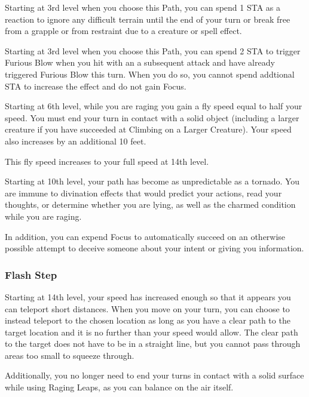 Starting at 3rd level when you choose this Path, you can spend 1 STA as a reaction to ignore any difficult terrain until the end of your turn or break free from a grapple or from restraint due to a creature or spell effect.

Starting at 3rd level when you choose this Path, you can spend 2 STA to trigger Furious Blow when you hit with an a subsequent attack and have already triggered Furious Blow this turn. When you do so, you cannot spend addtional STA to increase the effect and do not gain Focus.

Starting at 6th level, while you are raging you gain a fly speed equal to half your speed. You must end your turn in contact with a solid object (including a larger creature if you have succeeded at Climbing on a Larger Creature). Your speed also increases by an additional 10 feet.

This fly speed increases to your full speed at 14th level.

Starting at 10th level, your path has become as unpredictable as a tornado. You are immune to divination effects that would predict your actions, read your thoughts, or determine whether you are lying, as well as the charmed condition while you are raging.

In addition, you can expend Focus to automatically succeed on an otherwise possible attempt to deceive someone about your intent or giving you information.

\subsubsection{Flash Step}
Starting at 14th level, your speed has increased enough so that it appears you can teleport short distances. When you move on your turn, you can choose to instead teleport to the chosen location as long as you have a clear path to the target location and it is no further than your speed would allow. The clear path to the target does not have to be in a straight line, but you cannot pass through areas too small to squeeze through.

Additionally, you no longer need to end your turns in contact with a solid surface while using Raging Leaps, as you can balance on the air itself.
